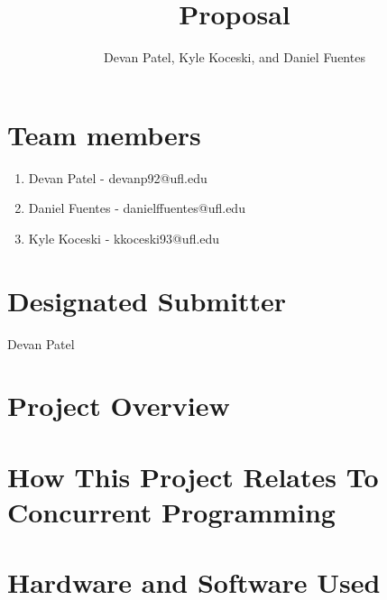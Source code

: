 \documentclass[12pt,a4paper]{report}
\author{Devan Patel, Kyle Koceski, and Daniel Fuentes}
\title{Proposal}
\begin{document}
\maketitle
\newpage
\section{Team members}
\begin{enumerate}
\item Devan Patel - devanp92@ufl.edu
\item Daniel Fuentes - danielffuentes@ufl.edu
\item Kyle Koceski - kkoceski93@ufl.edu
\end{enumerate}
\section{Designated Submitter}
\indent		Devan Patel
\section{Project Overview}

\section{How This Project Relates To Concurrent Programming}

\section{Hardware and Software Used}
\end{document}

